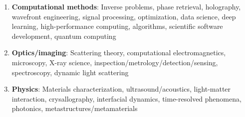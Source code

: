 \begin{enumerate}
    \item \textbf{Computational methods}: Inverse problems, phase retrieval, holography, wavefront engineering, signal processing, optimization, data science, deep learning, high-performance computing, algorithms, scientific software development, quantum computing
    \item \textbf{Optics/imaging}: Scattering theory, computational electromagnetics, microscopy, X-ray science, inspection/metrology/detection/sensing, spectroscopy, dynamic light scattering 
    \item \textbf{Physics}: Materials characterization, ultrasound/acoustics, light-matter interaction, crysallography, interfacial dynamics, time-resolved phenomena, photonics, metastructures/metamaterials
\end{enumerate}